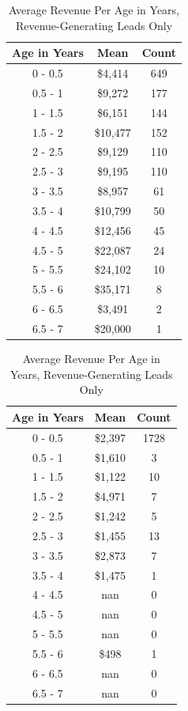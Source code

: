 \documentclass[11pt]{article}
\begin{document}
\begin{table}[h]
    \begin{subtable}[h]{0.45\textwidth}
        \centering
         \begin{tabular}{c|c|c}
        \textbf{Age in Years} & \textbf{Mean} & \textbf{Count} \\
        \hline
        0 - 0.5 & \$4,414 & 649 \\
        0.5 - 1 &\$9,272 & 177 \\
        1 - 1.5 &\$6,151 & 144 \\
        1.5 - 2 &\$10,477 & 152 \\
        2 - 2.5 &\$9,129 & 110 \\
        2.5 - 3 &\$9,195 & 110 \\
        3 - 3.5 &\$8,957 & 61 \\
        3.5 - 4 &\$10,799 & 50 \\
        4 - 4.5 &\$12,456 & 45 \\
        4.5 - 5 &\$22,087 & 24 \\
        5 - 5.5 &\$24,102 & 10 \\
        5.5 - 6 &\$35,171 & 8 \\
        6 - 6.5 &\$3,491 & 2 \\
        6.5 - 7 &\$20,000 & 1 \\
        \end{tabular}
       \caption{Revenue-generating Assigned Leads}
       \label{tab:week1}
    \end{subtable}
    \hfill
    \begin{subtable}[h]{0.45\textwidth}
        \centering
        \begin{tabular}{c|c|c}
    \textbf{Age in Years} & \textbf{Mean} & \textbf{Count} \\
    \hline
        0 - 0.5 &\$2,397 & 1728 \\
        0.5 - 1 &\$1,610 & 3 \\
        1 - 1.5 &\$1,122& 10 \\
        1.5 - 2 &\$4,971& 7 \\
        2 - 2.5 &\$1,242& 5 \\
        2.5 - 3 &\$1,455& 13 \\
        3 - 3.5 &\$2,873& 7 \\
        3.5 - 4 &\$1,475 & 1 \\
        4 - 4.5 & nan & 0 \\
        4.5 - 5 & nan & 0 \\
        5 - 5.5 & nan & 0 \\
        5.5 - 6 &\$498 & 1 \\
        6 - 6.5 & nan & 0 \\
        6.5 - 7 & nan & 0 \\
        \end{tabular}
    \caption{Revenue-generating Unassigned Leads}
        \label{tab:week2}
     \end{subtable}
     \caption{Average Revenue Per Age in Years, Revenue-Generating Leads Only}
     \label{tab:Table 3}
\end{table}
\end{document}
